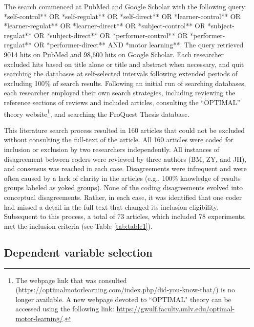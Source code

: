 \documentclass[
  english,
  man,floatsintext]{apa7}
\begin{document}
The search commenced at PubMed and Google Scholar with the following query: *self-control** OR *self-regulat** OR *self-direct** OR *learner-control** OR *learner-regulat** OR *learner-direct** OR *subject-control** OR *subject-regulat** OR *subject-direct** OR *performer-control** OR *performer-regulat** OR *performer-direct** AND *motor learning**. The query retrieved 9014 hits on PubMed and 98,600 hits on Google Scholar. Each researcher excluded hits based on title alone or title and abstract when necessary, and quit searching the databases at self-selected intervals following extended periods of excluding 100\% of search results. Following an initial run of searching databases, each researcher employed their own search strategies, including reviewing the reference sections of reviews and included articles, consulting the ``OPTIMAL'' theory website\footnote{The webpage link that was consulted (\url{https://optimalmotorlearning.com/index.php/did-you-know-that/}) is no longer available. A new webpage devoted to ``OPTIMAL" theory can be accessed using the following link: \url{https://gwulf.faculty.unlv.edu/optimal-motor-learning/}.}, and searching the ProQuest Thesis database.

This literature search process resulted in 160 articles that could not be excluded without consulting the full-text of the article. All 160 articles were coded for inclusion or exclusion by two researchers independently. All instances of disagreement between coders were reviewed by three authors (BM, ZY, and JH), and consensus was reached in each case. Disagreements were infrequent and were often caused by a lack of clarity in the articles (e.g., 100\% knowledge of results groups labeled as yoked groups). None of the coding disagreements evolved into conceptual disagreements. Rather, in each case, it was identified that one coder had missed a detail in the full text that changed its inclusion eligibility. Subsequent to this process, a total of 73 articles, which included 78 experiments, met the inclusion criteria (see Table \ref{tab:table1}).

\hypertarget{dependent-variable-selection}{%
\subsection{Dependent variable selection}\label{dependent-variable-selection}}
\end{document}
